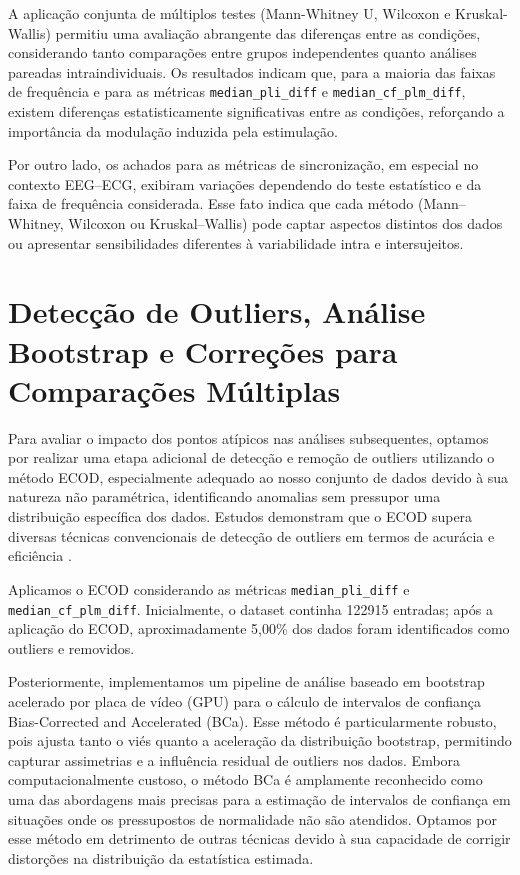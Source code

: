 A aplicação conjunta de múltiplos testes (Mann-Whitney U, Wilcoxon e Kruskal-Wallis) permitiu uma avaliação abrangente das diferenças entre as condições, considerando tanto comparações entre grupos independentes quanto análises pareadas intraindividuais. Os resultados indicam que, para a maioria das faixas de frequência e para as métricas \texttt{median\_pli\_diff} e \texttt{median\_cf\_plm\_diff}, existem diferenças estatisticamente significativas entre as condições, reforçando a importância da modulação induzida pela estimulação.

Por outro lado, os achados para as métricas de sincronização, em especial no contexto EEG–ECG, exibiram variações dependendo do teste estatístico e da faixa de frequência considerada. Esse fato indica que cada método (Mann–Whitney, Wilcoxon ou Kruskal–Wallis) pode captar aspectos distintos dos dados ou apresentar sensibilidades diferentes à variabilidade intra e intersujeitos.

\section{Detecção de Outliers, Análise Bootstrap e Correções para Comparações Múltiplas}
Para avaliar o impacto dos pontos atípicos nas análises subsequentes, optamos por realizar uma etapa adicional de detecção e remoção de outliers utilizando o método ECOD, especialmente adequado ao nosso conjunto de dados devido à sua natureza não paramétrica, identificando anomalias sem pressupor uma distribuição específica dos dados. Estudos demonstram que o ECOD supera diversas técnicas convencionais de detecção de outliers em termos de acurácia e eficiência \cite{li2022ecod}.

Aplicamos o ECOD considerando as métricas \texttt{median\_pli\_diff} e \texttt{median\_cf\_plm\_diff}. Inicialmente, o dataset continha 122915 entradas; após a aplicação do ECOD, aproximadamente 5,00\% dos dados foram identificados como outliers e removidos.

Posteriormente, implementamos um pipeline de análise baseado em bootstrap acelerado por placa de vídeo (GPU) para o cálculo de intervalos de confiança Bias-Corrected and Accelerated (BCa). Esse método é particularmente robusto, pois ajusta tanto o viés quanto a aceleração da distribuição bootstrap, permitindo capturar assimetrias e a influência residual de outliers nos dados. Embora computacionalmente custoso, o método BCa é amplamente reconhecido como uma das abordagens mais precisas para a estimação de intervalos de confiança em situações onde os pressupostos de normalidade não são atendidos. Optamos por esse método em detrimento de outras técnicas devido à sua capacidade de corrigir distorções na distribuição da estatística estimada.

